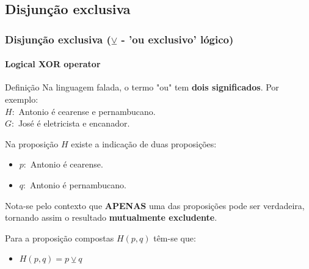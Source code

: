 \documentclass[10pt, headsepline, captions=tableabove, xcolor=table]{beamer}
\begin{document}
\subsection{Disjunção exclusiva}
%
\begin{frame}[t]
    \frametitle{Disjunção exclusiva ($\veebar$ - 'ou exclusivo' lógico)}
    \framesubtitle{Logical XOR operator}
    \begin{block}{Definição}
        Na linguagem falada, o termo "ou" tem \textbf{dois significados}. Por exemplo:\\ [2pt]
        $H:$ Antonio é cearense e pernambucano. \\[2pt]
        $G:$ José é eletricista e encanador.
    \end{block}
    \vspace{-2mm}
    \pause
    \begin{block}{}
        Na proposição $H$ existe a indicação de duas proposições:
        \begin{itemize}
            \item[] $p:$ Antonio é cearense.
            \item[] $q:$ Antonio é pernambucano.
        \end{itemize}
        Nota-se pelo contexto que \textbf{APENAS} uma das proposições pode ser verdadeira, tornando assim o resultado \textbf{mutualmente excludente}.
    \end{block}
    \vspace{-2mm}
    \pause
    \begin{block}{}
        Para a proposição compostas $H(p,q)$ têm-se que:
        \begin{itemize}
            \item $H(p,q) = p \veebar q$
        \end{itemize}
    \end{block}
\end{frame}
%
\end{document}
